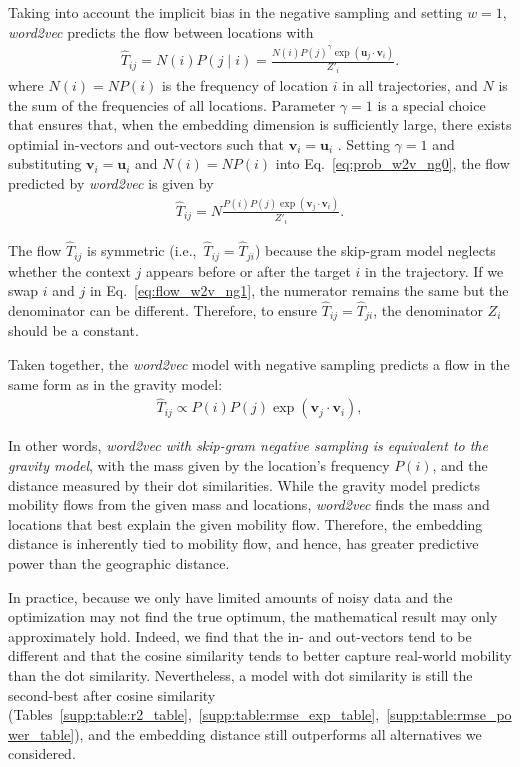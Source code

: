 \documentclass[12pt,draft,a4paper]{article}
\newcommand{\vect}[1]{\boldsymbol{#1}}
\def\given{\mid}
\def\ie{i.e.,~}
\begin{document}
Taking into account the implicit bias in the negative sampling  and setting $w=1$, \textit{word2vec} predicts the flow between locations with
\begin{align}
	\widehat{T}_{ij} =  N(i) P(j\given i) = \frac{N(i) P(j)^\gamma \exp(\vect{u}_j \cdot \vect{v}_{i})}{Z'_i}. \label{eq:prob_w2v_ng0}
\end{align}
where $N(i) = N P(i)$ is the frequency of location $i$ in all trajectories, and $N$ is the sum of the frequencies of all locations.
Parameter $\gamma=1$ is a special choice that ensures that, when the embedding dimension is sufficiently large, there exists optimial in-vectors and out-vectors such that $\vect{v}_i = \vect{u}_i$ \autocite{levy2014neural}.
Setting $\gamma = 1$ and substituting $\vect{v}_i = \vect{u}_i$ and $N(i) = N P(i)$ into Eq.~\eqref{eq:prob_w2v_ng0}, the flow predicted by {\it word2vec} is given by
\begin{align}
	\widehat{T}_{ij} =  N \frac{P(i)P(j)\exp(\vect{v}_j \cdot \vect{v}_{i})}{Z'_i}. \label{eq:flow_w2v_ng1}
\end{align}

The flow $\widehat{T}_{ij}$ is symmetric (\ie $\widehat{T}_{ij}=\widehat{T}_{ji}$) because the skip-gram model neglects whether the context $j$ appears before or after the target $i$ in the trajectory.
If we swap $i$ and $j$ in Eq.~\eqref{eq:flow_w2v_ng1}, the numerator remains the same but the denominator can be different.
Therefore, to ensure $\widehat{T}_{ij}=\widehat{T}_{ji}$, the denominator $Z_i$ should be a constant.

Taken together, the {\it word2vec} model with negative sampling predicts a flow in the same form as in the gravity model:
\begin{align}
	\widehat{T}_{ij} \propto  P(i) P(j)  \exp(\vect{v}_j \cdot \vect{v}_{i}), \label{eq:flow_w2v_ng0}
\end{align}

In other words, \emph{word2vec with skip-gram negative sampling is equivalent to the gravity model}, with the mass given by the location's frequency $P(i)$, and the distance measured by their dot similarities.
While the gravity model predicts mobility flows from the given mass and locations, {\it word2vec} finds the mass and locations that best explain the given mobility flow.
Therefore, the embedding distance is inherently tied to mobility flow, and hence, has greater predictive power than the geographic distance.

In practice, because we only have limited amounts of noisy data and the optimization may not find the true optimum, the mathematical result may only approximately hold.
Indeed, we find that the in- and out-vectors tend to be different and that the cosine similarity tends to better capture real-world mobility than the dot similarity.
Nevertheless, a model with dot similarity is still the second-best after cosine similarity (Tables~\ref{supp:table:r2_table},~\ref{supp:table:rmse_exp_table},~\ref{supp:table:rmse_power_table}), and the embedding distance still outperforms all alternatives we considered.
\end{document}
